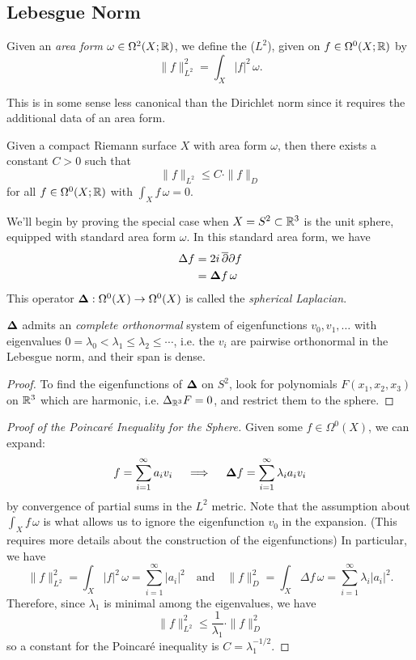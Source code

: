 \documentclass{lkx_paper}
\begin{document}
\subsection{Lebesgue Norm}

\begin{definition}
	Given an \emph{area form} $\omega\in\Omega^2(X; \mathbb{R})$, we define the  ($L^2$), given on $f\in \Omega^0(X; \mathbb{R})$ by
	\[
		\|f\|^2_{L^2} = \int_X |f|^2\,\omega.
	\]
\end{definition}

This is in some sense less canonical than the Dirichlet norm since it requires the additional data of an area form.

\begin{proposition}
	Given a compact Riemann surface $X$ with area form $\omega$, then there exists a constant $C>0$ such that
	\[
		\|f\|_{L^2} \leq C\cdot \|f\|_D
	\]
	for all $f\in \Omega^0(X; \mathbb{R})$ with $\int_X f\,\omega = 0$.
\end{proposition}

We'll begin by proving the special case when $X=S^2\subset \mathbb{R}^3$ is the unit sphere, equipped with standard area form $\omega$. In this standard area form, we have
\[
	\begin{aligned}
		\Delta f & = 2i\,\overline{\partial}\partial f       \\
		         & = \bm{\Delta} f\, \omega
	\end{aligned}
\]
This operator $\bm{\Delta} :\Omega^0(X) \to \Omega^0(X)$ is called the \emph{spherical Laplacian}.

\begin{lemma}
	$\bm{\Delta}$ admits an \emph{complete orthonormal} system of eigenfunctions $v_0, v_1,\ldots$ with eigenvalues $0=\lambda_0 < \lambda_1\leq \lambda_2\leq \cdots$, i.e. the $v_i$ are pairwise orthonormal in the Lebesgue norm, and their span is dense.
\end{lemma}

\begin{proof}
	To find the eigenfunctions of $\bm{\Delta}$ on $S^2$, look for polynomials $F(x_1, x_2, x_3)$ on $\mathbb{R}^3$ which are harmonic, i.e. $\Delta_{\mathbb{R}^3} F = 0$, and restrict them to the sphere.
\end{proof}

\begin{proof}[Proof of the Poincar\'e Inequality for the Sphere]
	Given some $f \in \Omega^0(X)$, we can expand:
	\[
		f = \sum^\infty_{i=1} a_i v_i\quad\implies\quad \bm{\Delta} f = \sum^\infty_{i=1} \lambda_i a_i v_i
	\]
	by convergence of partial sums in the $L^2$ metric. Note that the assumption about $\int_X f\, \omega$ is what allows us to ignore the eigenfunction $v_0$ in the expansion. (This requires more details about the construction of the eigenfunctions) In particular, we have
	\[
		\|f\|^2_{L^2} = \int_X |f|^2\,\omega =  \sum^\infty_{i=1}|a_i|^2\quad\textrm{and}\quad \|f\|^2_D = \int_X \Delta f\, \omega = \sum^\infty_{i=1} \lambda_i|a_i|^2.
	\]
	Therefore, since $\lambda_1$ is minimal among the eigenvalues, we have
	\[
		\|f\|^2_{L^2} \leq \frac{1}{\lambda_1}\cdot \|f\|^2_D
	\]
	so a constant for the Poincar\'e inequality is $C = \lambda_1^{-1/2}.$
\end{proof}
\end{document}
